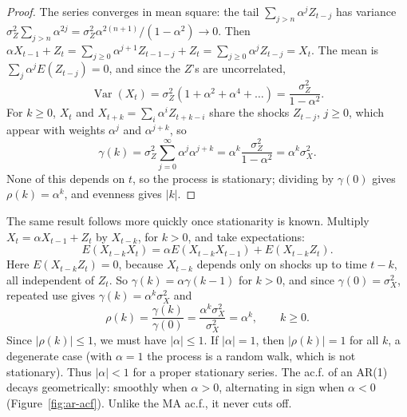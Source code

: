 \documentclass[11pt,a4paper]{article}
\theoremstyle{definition}
\DeclareMathOperator{\Var}{Var}
\begin{document}
\begin{proof}
The series converges in mean square: the tail $\sum_{j>n}\alpha^jZ_{t-j}$ has variance $\sigma_Z^2\sum_{j>n}\alpha^{2j} = \sigma_Z^2\alpha^{2(n+1)}/(1 - \alpha^2) \to 0$. Then
$\alpha X_{t-1} + Z_t = \sum_{j\ge0}\alpha^{j+1}Z_{t-1-j} + Z_t = \sum_{j\ge0}\alpha^jZ_{t-j} = X_t$. The mean is $\sum_j\alpha^jE(Z_{t-j}) = 0$, and since the $Z$'s are
uncorrelated,
\[
\Var(X_t) = \sigma_Z^2(1 + \alpha^2 + \alpha^4 + \dots) = \frac{\sigma_Z^2}{1 - \alpha^2} .
\]
For $k \ge 0$, $X_t$ and $X_{t+k} = \sum_i\alpha^iZ_{t+k-i}$ share the shocks $Z_{t-j}$, $j \ge 0$, which appear with weights $\alpha^j$ and $\alpha^{j+k}$, so
\[
\gamma(k) = \sigma_Z^2\sum_{j=0}^\infty\alpha^j\alpha^{j+k} = \alpha^k\frac{\sigma_Z^2}{1 - \alpha^2} = \alpha^k\sigma_X^2 .
\]
None of this depends on $t$, so the process is stationary; dividing by $\gamma(0)$ gives $\rho(k) = \alpha^k$, and evenness gives $|k|$.
\end{proof}

The same result follows more quickly once stationarity is known. Multiply $X_t = \alpha X_{t-1} + Z_t$ by $X_{t-k}$, for $k > 0$, and take
expectations:
\[
E(X_{t-k}X_t) = \alpha E(X_{t-k}X_{t-1}) + E(X_{t-k}Z_t) .
\]
Here $E(X_{t-k}Z_t) = 0$, because $X_{t-k}$ depends only on shocks up to time $t - k$, all independent of $Z_t$. So $\gamma(k) = \alpha\gamma(k - 1)$ for
$k > 0$, and since $\gamma(0) = \sigma_X^2$, repeated use gives $\gamma(k) = \alpha^k\sigma_X^2$ and
\[
\rho(k) = \frac{\gamma(k)}{\gamma(0)} = \frac{\alpha^k\sigma_X^2}{\sigma_X^2} = \alpha^k , \qquad k \ge 0 .
\]
Since $|\rho(k)| \le 1$, we must have $|\alpha| \le 1$. If $|\alpha| = 1$, then $|\rho(k)| = 1$ for all $k$, a degenerate case (with $\alpha = 1$ the process is a
random walk, which is not stationary). Thus $|\alpha| < 1$ for a proper stationary series. The ac.f. of an AR(1) decays
geometrically: smoothly when $\alpha > 0$, alternating in sign when $\alpha < 0$ (Figure~\ref{fig:ar-acf}). Unlike the MA ac.f., it never
cuts off.
\end{document}
